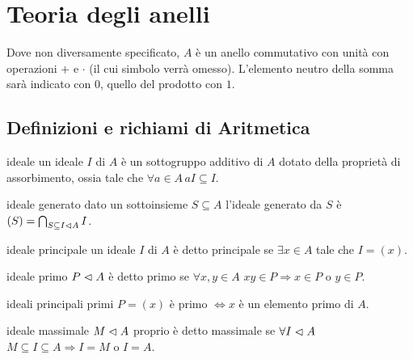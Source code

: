 \section{Teoria degli anelli}

Dove non diversamente specificato, $A$ è un anello commutativo con unità con operazioni $+$ e $\cdot$ (il cui simbolo verrà omesso). L'elemento neutro della somma sarà indicato con $0$, quello del prodotto con $1$.

\subsection{Definizioni e richiami di Aritmetica}

\begin{definition}{ideale}
    un ideale $I$ di $A$ è un sottogruppo additivo di $A$ dotato della proprietà di assorbimento, ossia tale che $\forall a \in A \, aI \subseteq I$.
\end{definition}
\begin{definition}{ideale generato}
    dato un sottoinsieme $S \subseteq A$ l'ideale generato da $S$ è $(S) = \bigcap_{S \subseteq I \vartriangleleft A} I$.
\end{definition}
\begin{definition}{ideale principale}
    un ideale $I$ di $A$ è detto principale se $\exists x \in A$ tale che $I = (x)$.
\end{definition}
\begin{definition}{ideale primo}
    $P \vartriangleleft A$ è detto primo se $\forall x,y \in A$ $xy \in P \Rightarrow x \in P$ o $y\in P$.
\end{definition}
\begin{proposition}{ideali principali primi}
    $P = (x)$ è primo $\iff x$ è un elemento primo di $A$.
\end{proposition}
\begin{definition}{ideale massimale}
    $M \vartriangleleft A$ proprio è detto massimale se $\forall I \vartriangleleft A$ $M \subseteq I\subseteq A \Rightarrow I = M$ o $I = A$.
\end{definition}

